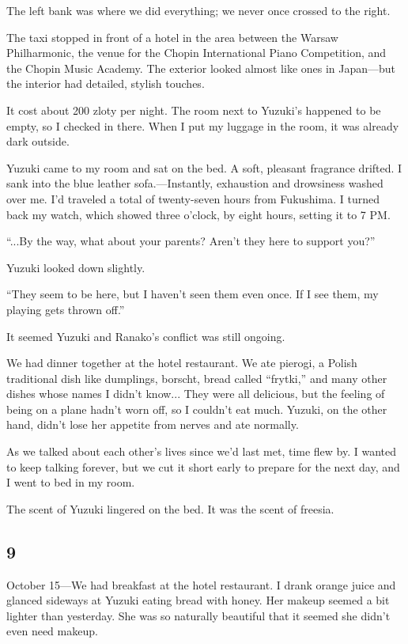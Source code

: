 \documentclass[
    a4paper,
    12pt,
    twoside,
    openany,
    UTF8,
    fontset=windows
]{ctexbook}
\begin{document}
The left bank was where we did everything; we never once crossed to the right.

The taxi stopped in front of a hotel in the area between the Warsaw Philharmonic, the venue for the Chopin International Piano Competition, and the Chopin Music Academy. The exterior looked almost like ones in Japan---but the interior had detailed, stylish touches.

It cost about 200 zloty per night. The room next to Yuzuki's happened to be empty, so I checked in there. When I put my luggage in the room, it was already dark outside.

Yuzuki came to my room and sat on the bed. A soft, pleasant fragrance drifted. I sank into the blue leather sofa.---Instantly, exhaustion and drowsiness washed over me. I'd traveled a total of twenty-seven hours from Fukushima. I turned back my watch, which showed three o'clock, by eight hours, setting it to 7 PM.

``...By the way, what about your parents? Aren't they here to support you?''

Yuzuki looked down slightly.

``They seem to be here, but I haven't seen them even once. If I see them, my playing gets thrown off.''

It seemed Yuzuki and Ranako's conflict was still ongoing.

We had dinner together at the hotel restaurant. We ate pierogi, a Polish traditional dish like dumplings, borscht, bread called ``frytki,'' and many other dishes whose names I didn't know... They were all delicious, but the feeling of being on a plane hadn't worn off, so I couldn't eat much. Yuzuki, on the other hand, didn't lose her appetite from nerves and ate normally.

As we talked about each other's lives since we'd last met, time flew by. I wanted to keep talking forever, but we cut it short early to prepare for the next day, and I went to bed in my room.

The scent of Yuzuki lingered on the bed. It was the scent of freesia.


\subsection*{9}

October 15---We had breakfast at the hotel restaurant. I drank orange juice and glanced sideways at Yuzuki eating bread with honey. Her makeup seemed a bit lighter than yesterday. She was so naturally beautiful that it seemed she didn't even need makeup.
\end{document}
